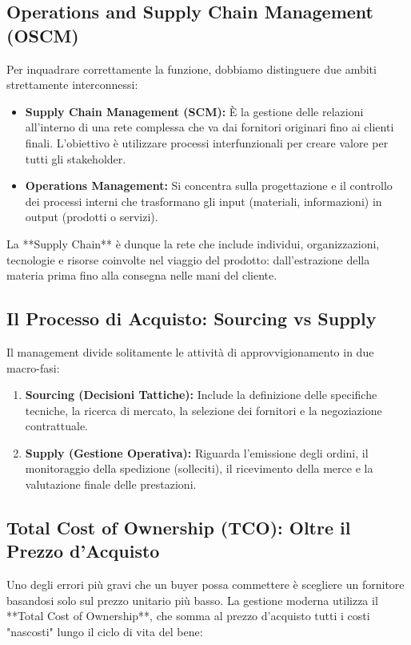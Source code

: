 \documentclass[a4paper,10pt]{article}
\begin{document}
\subsection*{Operations and Supply Chain Management (OSCM)}

Per inquadrare correttamente la funzione, dobbiamo distinguere due ambiti strettamente interconnessi:
\begin{itemize}
    \item \textbf{Supply Chain Management (SCM):} È la gestione delle relazioni all'interno di una rete complessa che va dai fornitori originari fino ai clienti finali. L'obiettivo è utilizzare processi interfunzionali per creare valore per tutti gli stakeholder.
    \item \textbf{Operations Management:} Si concentra sulla progettazione e il controllo dei processi interni che trasformano gli input (materiali, informazioni) in output (prodotti o servizi).
\end{itemize}
La **Supply Chain** è dunque la rete che include individui, organizzazioni, tecnologie e risorse coinvolte nel viaggio del prodotto: dall'estrazione della materia prima fino alla consegna nelle mani del cliente.

\subsection*{Il Processo di Acquisto: Sourcing vs Supply}

Il management divide solitamente le attività di approvvigionamento in due macro-fasi:
\begin{enumerate}
    \item \textbf{Sourcing (Decisioni Tattiche):} Include la definizione delle specifiche tecniche, la ricerca di mercato, la selezione dei fornitori e la negoziazione contrattuale.
    \item \textbf{Supply (Gestione Operativa):} Riguarda l'emissione degli ordini, il monitoraggio della spedizione (solleciti), il ricevimento della merce e la valutazione finale delle prestazioni.
\end{enumerate}

\subsection*{Total Cost of Ownership (TCO): Oltre il Prezzo d'Acquisto}

Uno degli errori più gravi che un buyer possa commettere è scegliere un fornitore basandosi solo sul prezzo unitario più basso. La gestione moderna utilizza il **Total Cost of Ownership**, che somma al prezzo d'acquisto tutti i costi "nascosti" lungo il ciclo di vita del bene:
\end{document}

